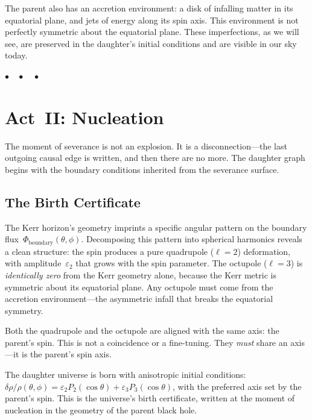 \documentclass[12pt,a4paper]{article}
\begin{document}
The parent also has an accretion environment: a disk of infalling matter in its equatorial plane, and jets of energy along its spin axis. This environment is not perfectly symmetric about the equatorial plane. These imperfections, as we will see, are preserved in the daughter's initial conditions and are visible in our sky today.

\bigskip\begin{center}$\bullet\quad\bullet\quad\bullet$\end{center}\bigskip

\section{Act~II: Nucleation}

The moment of severance is not an explosion. It is a disconnection---the last outgoing causal edge is written, and then there are no more. The daughter graph begins with the boundary conditions inherited from the severance surface.

\subsection{The Birth Certificate}

The Kerr horizon's geometry imprints a specific angular pattern on the boundary flux~$\Phi_{\mathrm{boundary}}(\theta,\phi)$. Decomposing this pattern into spherical harmonics reveals a clean structure: the spin produces a pure quadrupole ($\ell=2$) deformation, with amplitude~$\varepsilon_2$ that grows with the spin parameter. The octupole ($\ell=3$) is \emph{identically zero} from the Kerr geometry alone, because the Kerr metric is symmetric about its equatorial plane. Any octupole must come from the accretion environment---the asymmetric infall that breaks the equatorial symmetry.

Both the quadrupole and the octupole are aligned with the same axis: the parent's spin. This is not a coincidence or a fine-tuning. They \emph{must} share an axis---it is the parent's spin axis.

The daughter universe is born with anisotropic initial conditions: $\delta\rho/\rho(\theta,\phi) = \varepsilon_2 P_2(\cos\theta) + \varepsilon_3 P_3(\cos\theta)$, with the preferred axis set by the parent's spin. This is the universe's birth certificate, written at the moment of nucleation in the geometry of the parent black hole.
\end{document}
